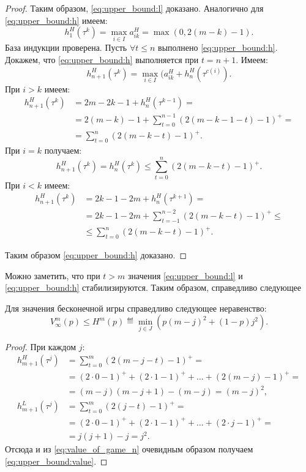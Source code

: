 \begin{proof}
Таким образом, \eqref{eq:upper_bound:l} доказано.
Аналогично для \eqref{eq:upper_bound:h} имеем:
\[
  h_1^H(\tau^k) = \max_{i \in I} a_{ik}^H = \max(0, 2(m - k) - 1).
\]
База индукции проверена.
Пусть $ \forall t \leq n $ выполнено \eqref{eq:upper_bound:h}. Докажем, что \eqref{eq:upper_bound:h} выполняется при $ t = n + 1 $. Имеем:
\[
h_{n+1}^H(\tau^k) = \max_{i \in I}(a_{ik}^H + h_n^H(\tau^{c(i)}).
\]
При $ i > k $ имеем:
\begin{align*}
  h_{n+1}^H(\tau^k) 
  &= 2m - 2k - 1 + h_n^H(\tau^{k-1}) = \\
  &= 2(m-k)- 1 + \sum_{t = 0}^{n-1}(2(m-k-1-t)-1)^+ = \\
  &= \sum_{t = 0}^n (2(m-k-t) - 1)^+.
\end{align*}
При $ i = k $ получаем:
\[
  h_{n+1}^H(\tau^k) = h_n^H(\tau^k) \leq \sum_{t=0}^n(2(m-k-t)-1)^+.
\]
При $ i < k $ имеем:
\begin{align*}
  h_{n+1}^H(\tau^k) 
    &= 2k - 1 - 2m + h_n^H(\tau^{k+1}) = \\
    &= 2k - 1 - 2m + \sum_{t = -1}^{n-2} (2(m-k-t)-1)^+ \leq \\
    &\leq \sum_{t=0}^n(2(m-k-t)-1)^+.
\end{align*}

Таким образом \eqref{eq:upper_bound:h} доказано.
\end{proof}

Можно заметить, что при $ t > m $ значения \eqref{eq:upper_bound:l} и \eqref{eq:upper_bound:h} стабилизируются. Таким образом, справедливо следующее

\begin{utver}
Для значения бесконечной игры справедливо следующее неравенство:
\begin{equation}
\label{eq:upper_bound:value}
V_\infty^m(p) 
\leq
H^m(p) \eqdef \min_{j \in J}
    (p(m-j)^2 + (1-p)j^2).
\end{equation}
\end{utver}
\begin{proof}
При каждом $ j $:
\begin{align*}
h_{m+1}^H(\tau^j) 
&= \sum_{t=0}^m (2(m-j-t)-1)^+ = \\
&= (2 \cdot 0 - 1)^+ + (2 \cdot 1 - 1)^+ + \ldots + (2(m-j) - 1)^+ = \\
&= (m-j)(m-j+1) - (m-j) = (m-j)^2,
\\
h_{m+1}^L(\tau^j)
&= \sum_{t=0}^m (2(j-t)-1)^+ = \\
&= (2 \cdot 0 - 1)^+ + (2 \cdot 1 - 1)^+ + \ldots + (2 \cdot j - 1)^+ = \\
&= j(j+1) - j = j^2.
\end{align*}
Отсюда и из \eqref{eq:value_of_game_n} очевидным образом получаем \eqref{eq:upper_bound:value}.
\end{proof}

